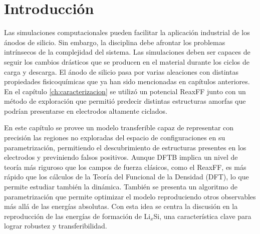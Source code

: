 \section{Introducción}

Las simulaciones computacionales pueden facilitar la aplicación industrial de los
ánodos de silicio. Sin embargo, la disciplina debe afrontar los problemas 
intrínsecos de la complejidad del sistema. Las simulaciones deben ser capaces
de seguir los cambios drásticos que se producen en el material durante los ciclos
de carga y descarga. El ánodo de silicio pasa por varias aleaciones con distintas
propiedades fisicoquímicas que ya han sido mencionadas en capítulos anteriores.
En el capítulo \ref{ch:caracterizacion} se utilizó un potencial ReaxFF 
\cite{fan2013} junto con un método de exploración que permitió predecir distintas
estructuras amorfas que podrían presentarse en electrodos altamente ciclados.

En este capítulo se provee un modelo transferible capaz de representar con 
precisión las regiones no exploradas del espacio de configuraciones en su 
parametrización, permitiendo el descubrimiento de estructuras presentes en los
electrodos y previniendo falsos positivos. Aunque DFTB implica un nivel de teoría
más riguroso que los campos de fuerza clásicos, como el ReaxFF, es más rápido que
los cálculos de la Teoría del Funcional de la Densidad (DFT), lo que permite 
estudiar también la dinámica. También se presenta un algoritmo de parametrización
que permite optimizar el modelo reproduciendo otros observables más allá de las
energías absolutas. Con esta idea se centra la discusión en la reproducción de las
energías de formación de Li$_x$Si, una característica clave para lograr robustez
y transferibilidad. 
